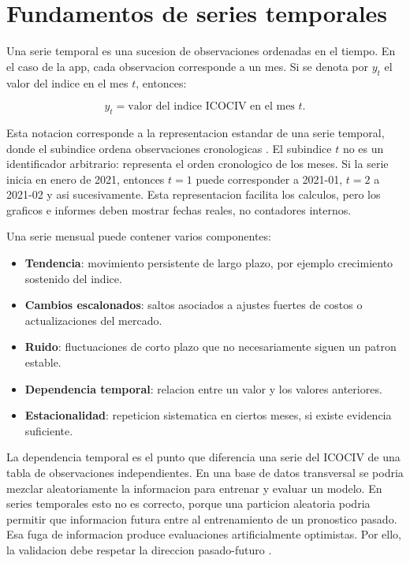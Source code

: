 ﻿\documentclass[12pt,letterpaper]{article}
\newcommand{\ICOCIV}{ICOCIV}
\begin{document}
\section{Fundamentos de series temporales}

Una serie temporal es una sucesion de observaciones ordenadas en el tiempo. En el caso de la app, cada observacion corresponde a un mes. Si se denota por \(y_t\) el valor del indice en el mes \(t\), entonces:

\[
y_t = \text{valor del indice ICOCIV en el mes } t.
\]

Esta notacion corresponde a la representacion estandar de una serie temporal, donde el subindice ordena observaciones cronologicas \citep{hyndman2021fpp3}. El subindice \(t\) no es un identificador arbitrario: representa el orden cronologico de los meses. Si la serie inicia en enero de 2021, entonces \(t=1\) puede corresponder a 2021-01, \(t=2\) a 2021-02 y asi sucesivamente. Esta representacion facilita los calculos, pero los graficos e informes deben mostrar fechas reales, no contadores internos.

Una serie mensual puede contener varios componentes:

\begin{itemize}[leftmargin=*]
    \item \textbf{Tendencia}: movimiento persistente de largo plazo, por ejemplo crecimiento sostenido del indice.
    \item \textbf{Cambios escalonados}: saltos asociados a ajustes fuertes de costos o actualizaciones del mercado.
    \item \textbf{Ruido}: fluctuaciones de corto plazo que no necesariamente siguen un patron estable.
    \item \textbf{Dependencia temporal}: relacion entre un valor y los valores anteriores.
    \item \textbf{Estacionalidad}: repeticion sistematica en ciertos meses, si existe evidencia suficiente.
\end{itemize}

La dependencia temporal es el punto que diferencia una serie del \ICOCIV{} de una tabla de observaciones independientes. En una base de datos transversal se podria mezclar aleatoriamente la informacion para entrenar y evaluar un modelo. En series temporales esto no es correcto, porque una particion aleatoria podria permitir que informacion futura entre al entrenamiento de un pronostico pasado. Esa fuga de informacion produce evaluaciones artificialmente optimistas. Por ello, la validacion debe respetar la direccion pasado-futuro \citep{tashman2000,hyndman2021fpp3}.
\end{document}
